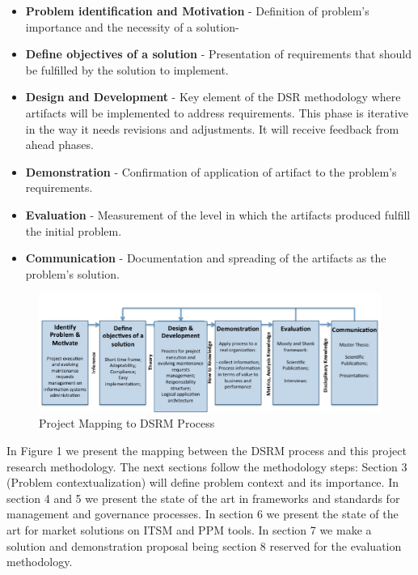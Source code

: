 \begin{itemize}
  \item \textbf{Problem identification and Motivation} - Definition of problem's importance and the necessity of a solution-
  \item \textbf{Define objectives of a solution} - Presentation of requirements that should be fulfilled by the solution to implement. 
  \item \textbf{Design and Development} - Key element of the DSR methodology where artifacts will be implemented to address requirements. This phase is iterative in the way it needs revisions and adjustments. It will receive feedback from ahead phases.
  \item \textbf{Demonstration} -  Confirmation of application of artifact to the problem's requirements.
  \item \textbf{Evaluation} - Measurement of the level in which the artifacts produced fulfill the initial problem.
  \item \textbf{Communication} - Documentation and spreading of the artifacts as the problem's solution.
\end{itemize}

\begin{figure}[h!]
\centering
\includegraphics[width=\textwidth]{img/DSRMProcessMapping.png}
\caption{Project Mapping to DSRM Process}
\end{figure}


In Figure 1 we present the mapping between the DSRM process and this project research methodology. The next sections follow the methodology steps: Section 3 (Problem contextualization) will define problem context and its importance. In section 4 and 5 we present the state of the art in frameworks and standards for management and governance processes. In section 6 we present the state of the art for market solutions on ITSM and PPM tools. In section 7 we make a solution and demonstration proposal being section 8 reserved for the evaluation methodology.\par


